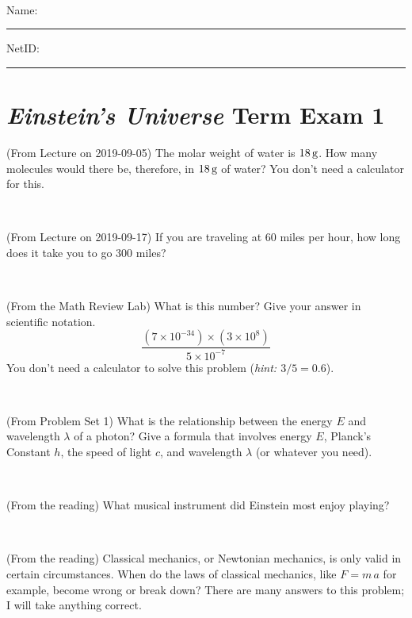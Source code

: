 \documentclass[12pt, letterpaper]{article}
\begin{document}
\vfill ~


\cleardoublepage



\noindent
Name: \rule[-1ex]{0.60\textwidth}{0.1pt}
NetID: \rule[-1ex]{0.20\textwidth}{0.1pt}

\section*{\textsl{Einstein's Universe} Term Exam 1}
\setcounter{problem}{1}


\begin{problem} (From Lecture on 2019-09-05)
The molar weight of water is $18\,\mathrm{g}$. How many molecules would there
be, therefore, in $18\,\mathrm{g}$ of water? You don't need a calculator for
this.
\end{problem}


\vfill ~

\begin{problem} (From Lecture on 2019-09-17)
If you are traveling at 60 miles per hour, how long does
it take you to go 300 miles?
\end{problem}


\vfill ~

\begin{problem} (From the Math Review Lab)
What is this number? Give your answer in scientific notation.
$$
\frac{(7\times10^{-34})\times(3\times10^8)}{5\times10^{-7}}
$$
You don't need a calculator to solve this problem (\textit{hint: $3/5=0.6$}).
\end{problem}


\vfill ~

\begin{problem} (From Problem Set 1)
What is the relationship between the energy $E$ and wavelength
$\lambda$ of a photon? Give a formula that involves energy $E$,
Planck's Constant $h$, the speed of light $c$, and wavelength
$\lambda$ (or whatever you need).
\end{problem}

\vfill ~


\clearpage


\begin{problem} (From the reading)
What musical instrument did Einstein most enjoy playing?
\end{problem}


\vfill ~

\begin{problem} (From the reading)
Classical mechanics, or Newtonian mechanics, is only valid in certain
circumstances. When do the laws of classical mechanics, like $F =
m\,a$ for example, become wrong or break down? There are many answers
to this problem; I will take anything correct.
\end{problem}
\end{document}

